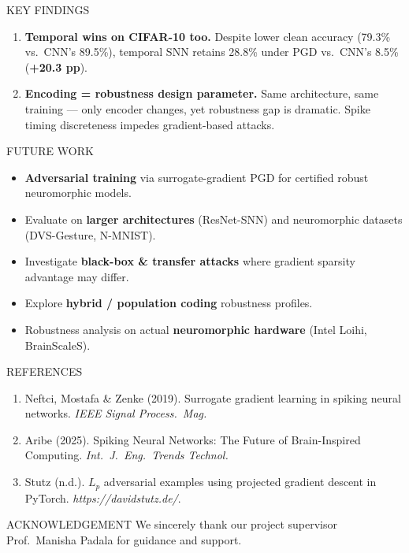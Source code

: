 \documentclass[final]{beamer}
\newlength{\colfour}
\begin{document}
\begin{frame}[t]
\begin{columns}[t]
\begin{column}{\colfour}
\begin{block}{KEY FINDINGS}
\begin{futurebox}
\begin{enumerate}
        \item \textbf{Temporal wins on CIFAR-10 too.}
              Despite lower clean accuracy (79.3\% vs.\ CNN's 89.5\%),
              temporal SNN retains 28.8\% under PGD vs.\ CNN's 8.5\%
              (\textbf{+20.3 pp}).

        \item \textbf{Encoding = robustness design parameter.}
              Same architecture, same training — only encoder changes,
              yet robustness gap is dramatic. Spike timing discreteness
              impedes gradient-based attacks.
      \end{enumerate}
    \end{futurebox}
  \end{block}

  \begin{block}{FUTURE WORK}
    \begin{itemize}
      \item \textbf{Adversarial training} via surrogate-gradient PGD for
            certified robust neuromorphic models.
      \item Evaluate on \textbf{larger architectures} (ResNet-SNN) and
            neuromorphic datasets (DVS-Gesture, N-MNIST).
      \item Investigate \textbf{black-box \& transfer attacks} where gradient
            sparsity advantage may differ.
      \item Explore \textbf{hybrid / population coding} robustness profiles.
      \item Robustness analysis on actual \textbf{neuromorphic hardware}
            (Intel Loihi, BrainScaleS).
    \end{itemize}
  \end{block}

  \begin{block}{REFERENCES}
    \footnotesize
    \begin{enumerate}
      \item Neftci, Mostafa \& Zenke (2019). Surrogate gradient learning in
            spiking neural networks. \textit{IEEE Signal Process.\ Mag.}
      \item Aribe (2025). Spiking Neural Networks: The Future of Brain-Inspired
            Computing. \textit{Int.\ J.\ Eng.\ Trends Technol.}
      \item Stutz (n.d.). $L_p$ adversarial examples using projected gradient
            descent in PyTorch. \textit{https://davidstutz.de/}.
    \end{enumerate}
  \end{block}
  \begin{block}{ACKNOWLEDGEMENT}
  We sincerely thank our project supervisor Prof.\ Manisha Padala for guidance and support.
      

\end{block}
\end{column}
\end{columns}
\end{frame}
\end{document}
